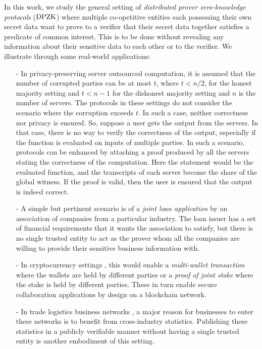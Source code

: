 In this work, we study the general setting of \textit{distributed prover
zero-knowledge protocols} ($\text{DPZK}$) where multiple co-opetitive entities each possessing their own secret
data want to prove to a verifier that their secret data together satisfies a
predicate of common interest. This is to be done without revealing any information
about their sensitive data to each other or to the verifier. We illustrate
through some  real-world applications: %
\begin{itemize}
	\item[-] In privacy-preserving server outsourced computation, it is assumed that the number of corrupted parties can be at most $t$, where $t<n/2$, for the honest majority setting and $t<n-1$ for the dishonest majority setting and $n$ is the number of servers. The protocols in these settings do not consider the scenario where the corruption exceeds $t$. In such a case, neither correctness nor privacy is ensured. So, suppose a user gets the output from the servers. In that case, there is no way to verify the correctness of the output, especially if the function is evaluated on inputs of multiple parties. In such a scenario, protocols can be enhanced by attaching a proof produced by all the servers stating the correctness of the computation. Here the statement would be the evaluated function, and the transcripts of each server become the share of the global witness. If the proof is valid, then the user is ensured that the output is indeed correct.
	\item[-] A simple but pertinent scenario is of a \textit{joint loan application} by an association of companies from a particular industry. The loan issuer has a set of financial requirements that it wants the association to satisfy, but there is no single trusted entity to act as the prover whom all the companies are willing to provide their sensitive business information with.
	\item[-] In cryptocurrency settings \cite{bitcoin, ethereum, zerocash}, this would enable a \textit{multi-wallet transaction} where the wallets are held by different parties or a \textit{proof of joint stake} where the stake is held by different parties. These in turn enable secure collaboration applications by design on a blockchain network. %
	\item[-] In trade logistics business networks \cite{scbn, e2open, tradelens}, a major reason for businesses to enter these networks is to benefit from cross-industry statistics. Publishing these statistics in a publicly verifiable manner without having a single trusted entity is another embodiment of this setting.
\end{itemize}

